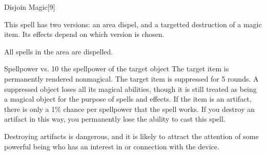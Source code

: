\begin{spellsection}{Disjoin Magic}[9]
    \begin{spellheader}
    \end{spellheader}
    \begin{spellcontent}
        \begin{spelltargetinginfo}
            \spellspecial This spell has two versions: an area dispel, and a targetted destruction of a magic item. Its effects depend on which version is chosen.
        \end{spelltargetinginfo}
    \end{spellcontent}
    \begin{spellsubcontent}
        \begin{spelltargetinginfo}
        \end{spelltargetinginfo}
        \begin{spelleffects}
            \spelleffect All spells in the area are dispelled.
        \end{spelleffects}
    \end{spellsubcontent}
    \begin{spellsubcontent}
        \begin{spelltargetinginfo}
        \end{spelltargetinginfo}
        \begin{spelleffects}
            \begin{spellattack}{Spellpower vs. 10 \add the spellpower of the target object}
                \spellsuccess The target item is permanently rendered nonmagical.
                \spellfailure The target item is suppressed for 5 rounds. A suppressed object loses all its magical abilities, though it is still treated as being a magical object for the purpose of spells and effects.
                \spellspecial If the item is an artifact, there is only a 1\% chance per spellpower that the spell works. If you destroy an artifact in this way, you permanently lose the ability to cast this spell.
            \end{spellattack}
        \end{spelleffects}
    \end{spellsubcontent}
    \begin{spellfooter}
        \spellnotes Destroying artifacts is dangerous, and it is likely to attract the attention of some powerful being who has an interest in or connection with the device.
        \miscastyou
    \end{spellfooter}
\end{spellsection}

